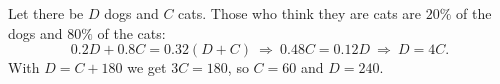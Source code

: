 Let there be $D$ dogs and $C$ cats. Those who think they are cats are $20\%$ of the dogs and $80\%$ of the cats:
\[0.2D+0.8C=0.32(D+C)\ \Longrightarrow\ 0.48C=0.12D\ \Longrightarrow\ D=4C.\]
With $D=C+180$ we get $3C=180$, so $C=60$ and $D=\boxed{240}$.
